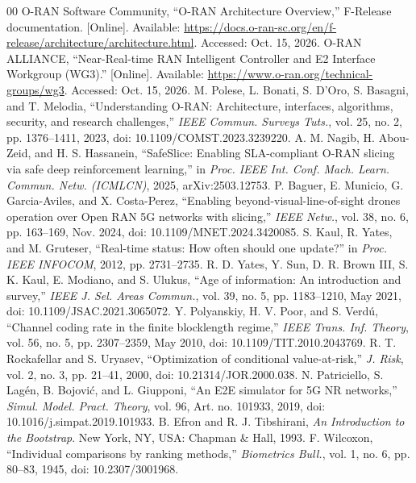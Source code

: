 \documentclass[conference]{IEEEtran}
\begin{document}
\begin{thebibliography}{00}
 O-RAN Software Community, ``O-RAN Architecture Overview,'' F-Release documentation. [Online]. Available: \url{https://docs.o-ran-sc.org/en/f-release/architecture/architecture.html}. Accessed: Oct. 15, 2026.
 O-RAN ALLIANCE, ``Near-Real-time RAN Intelligent Controller and E2 Interface Workgroup (WG3).'' [Online]. Available: \url{https://www.o-ran.org/technical-groups/wg3}. Accessed: Oct. 15, 2026.
 M. Polese, L. Bonati, S. D'Oro, S. Basagni, and T. Melodia, ``Understanding O-RAN: Architecture, interfaces, algorithms, security, and research challenges,'' \emph{IEEE Commun. Surveys Tuts.}, vol. 25, no. 2, pp. 1376--1411, 2023, doi: 10.1109/COMST.2023.3239220.
 A. M. Nagib, H. Abou-Zeid, and H. S. Hassanein, ``SafeSlice: Enabling SLA-compliant O-RAN slicing via safe deep reinforcement learning,'' in \emph{Proc. IEEE Int. Conf. Mach. Learn. Commun. Netw. (ICMLCN)}, 2025, arXiv:2503.12753.
 P. Baguer, E. Municio, G. Garcia-Aviles, and X. Costa-Perez, ``Enabling beyond-visual-line-of-sight drones operation over Open RAN 5G networks with slicing,'' \emph{IEEE Netw.}, vol. 38, no. 6, pp. 163--169, Nov. 2024, doi: 10.1109/MNET.2024.3420085.
 S. Kaul, R. Yates, and M. Gruteser, ``Real-time status: How often should one update?'' in \emph{Proc. IEEE INFOCOM}, 2012, pp. 2731--2735.
 R. D. Yates, Y. Sun, D. R. Brown III, S. K. Kaul, E. Modiano, and S. Ulukus, ``Age of information: An introduction and survey,'' \emph{IEEE J. Sel. Areas Commun.}, vol. 39, no. 5, pp. 1183--1210, May 2021, doi: 10.1109/JSAC.2021.3065072.
 Y. Polyanskiy, H. V. Poor, and S. Verd\'u, ``Channel coding rate in the finite blocklength regime,'' \emph{IEEE Trans. Inf. Theory}, vol. 56, no. 5, pp. 2307--2359, May 2010, doi: 10.1109/TIT.2010.2043769.
 R. T. Rockafellar and S. Uryasev, ``Optimization of conditional value-at-risk,'' \emph{J. Risk}, vol. 2, no. 3, pp. 21--41, 2000, doi: 10.21314/JOR.2000.038.
 N. Patriciello, S. Lag\'en, B. Bojovi\'c, and L. Giupponi, ``An E2E simulator for 5G NR networks,'' \emph{Simul. Model. Pract. Theory}, vol. 96, Art. no. 101933, 2019, doi: 10.1016/j.simpat.2019.101933.
 B. Efron and R. J. Tibshirani, \emph{An Introduction to the Bootstrap}. New York, NY, USA: Chapman \& Hall, 1993.
 F. Wilcoxon, ``Individual comparisons by ranking methods,'' \emph{Biometrics Bull.}, vol. 1, no. 6, pp. 80--83, 1945, doi: 10.2307/3001968.
\end{thebibliography}
\end{document}
